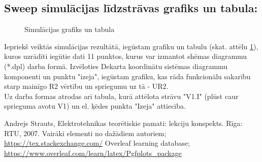 \documentclass {report}
\begin{document}
\subsection{Sweep simulācijas līdzstrāvas grafiks un tabula:}
\begin{figure}[h]
    \centering
    \caption{Simulācijas grafiks un tabula}
    \label{fig:5th}
\end{figure}

\indent Iepriekš veiktās simulācijas rezultātā, iegūstam grafiku un tabulu (skat. attēlu \ref{fig:5th}), kuros uzrādīti iegūtie dati 11 punktos, kurus var izmantot shēmas diagrammu (*.dpl) darba formā. Izvēloties Dekarta koordinātu sistēmas diagrammu komponenti un punktu "izeja", iegūstam grafiku, kas rāda funkcionālu sakarību starp mainīgo R2 vērtību un spriegumu uz tā - UR2. \\ \indent Uz darba formas atrodas arī tabula, kurā attēlota strāvu "V1.I" (plūst caur sprieguma avotu V1) un el. ķēdes punkta "Izeja" attiecība.
\begin{thebibliography}{9}
Andrejs Strauts, Elektrotehnikas teorētiskie pamati: lekciju konspekts. Rīga: RTU, 2007.
Vairāki elementi no dažādiem autoriem;  \url{https://tex.stackexchange.com/}
Overleaf learning database; \url{https://www.overleaf.com/learn/latex/Pgfplots_package}
\end{thebibliography}
\end{document}
